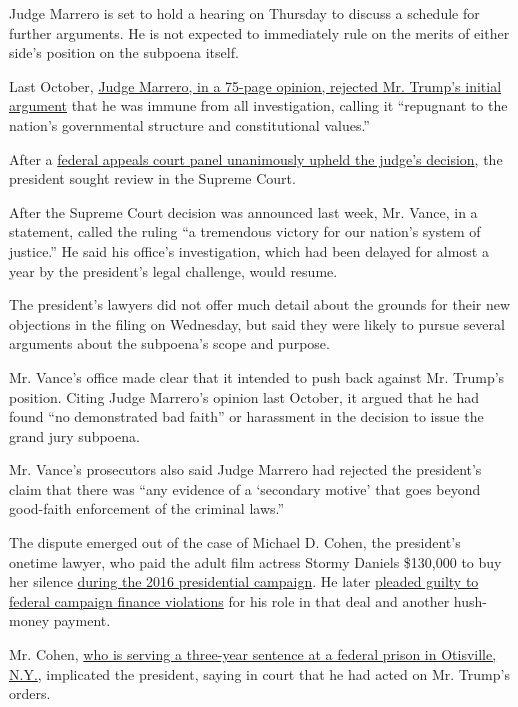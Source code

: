 Judge Marrero is set to hold a hearing on Thursday to discuss a schedule
for further arguments. He is not expected to immediately rule on the
merits of either side's position on the subpoena itself.

Last October,
\href{https://www.nytimes3xbfgragh.onion/2019/10/07/nyregion/trump-taxes-lawsuit-vance.html}{Judge
Marrero, in a 75-page opinion, rejected Mr. Trump's initial argument}
that he was immune from all investigation, calling it ``repugnant to the
nation's governmental structure and constitutional values.''

After a
\href{https://www.nytimes3xbfgragh.onion/2019/11/04/nyregion/trump-taxes-vance-appeal.html}{federal
appeals court panel unanimously upheld the judge's decision}, the
president sought review in the Supreme Court.

After the Supreme Court decision was announced last week, Mr. Vance, in
a statement, called the ruling ``a tremendous victory for our nation's
system of justice.'' He said his office's investigation, which had been
delayed for almost a year by the president's legal challenge, would
resume.

The president's lawyers did not offer much detail about the grounds for
their new objections in the filing on Wednesday, but said they were
likely to pursue several arguments about the subpoena's scope and
purpose.

Mr. Vance's office made clear that it intended to push back against Mr.
Trump's position. Citing Judge Marrero's opinion last October, it argued
that he had found ``no demonstrated bad faith'' or harassment in the
decision to issue the grand jury subpoena.

Mr. Vance's prosecutors also said Judge Marrero had rejected the
president's claim that there was ``any evidence of a `secondary motive'
that goes beyond good-faith enforcement of the criminal laws.''

The dispute emerged out of the case of Michael D. Cohen, the president's
onetime lawyer, who paid the adult film actress Stormy Daniels \$130,000
to buy her silence
\href{https://www.nytimes3xbfgragh.onion/2019/08/01/nyregion/trump-cohen-stormy-daniels-vance.html}{during
the 2016 presidential campaign}. He later
\href{https://www.nytimes3xbfgragh.onion/2018/11/29/nyregion/michael-cohen-trump-russia-mueller.html}{pleaded
guilty to federal campaign finance violations} for his role in that deal
and another hush-money payment.

Mr. Cohen,
\href{https://www.nytimes3xbfgragh.onion/2018/12/12/nyregion/michael-cohen-sentence-trump.html}{who
is serving a three-year sentence at a federal prison in Otisville,
N.Y.}, implicated the president, saying in court that he had acted on
Mr. Trump's orders.

